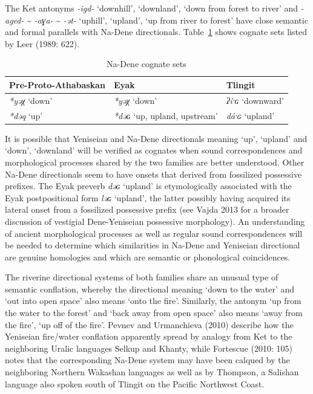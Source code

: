 The Ket antonyms \textit{{}-igd-} ‘downhill’, ‘downland’, ‘down from forest to river’ and \textit{{}-aged-} \~{} \textit{{}-aɣa-} \~{} \textit{{}-ət-} ‘uphill’, ‘upland’, ‘up from river to forest’ have close semantic and formal parallels with Na-Dene directionals. Table~\ref{tab:na-dene} shows cognate sets listed by Leer (1989: 622).

\begin{table}[htb]
\centering
\begin{tabular}{l | l | l}
Pre-Proto-Athabaskan & Eyak & Tlingit \\
\hline
\textit{*yəχ} `down' &  \textit{*yəχ} `down' & \textit{ʔíˑɢ} `downward' \\
\textit{*dəq} `up' & \textit{*dəɢ} `up, upland, upstream' & \textit{d\'{a}ˑɢ} `upland' \\
\end{tabular}
\caption{Na-Dene cognate sets}
\label{tab:na-dene}
\end{table}

It is possible that Yeniseian and Na-Dene directionals meaning ‘up’, ‘upland’ and ‘down’, ‘downland’ will be verified as cognates when sound correspondences and morphological processes shared by the two families are better understood. Other Na-Dene directionals seem to have onsets that derived from fossilized possessive prefixes. The Eyak preverb \textit{dəɢ }‘upland’ is etymologically associated with the Eyak postpositional form\textit{ ləɢ }‘upland’, the latter possibly having acquired its lateral onset from a fossilized possessive prefix (see Vajda 2013 for a broader discussion of vestigial Dene-Yeniseian possessive morphology). An understanding of ancient morphological processes as well as regular sound correspondences will be needed to determine which similarities in Na-Dene and Yeniseian directional are genuine homologies and which are semantic or phonological coincidences.

The riverine directional systems of both families share an unusual type of semantic conflation, whereby the directional meaning ‘down to the water’ and ‘out into open space’ also means ‘onto the fire’. Similarly, the antonym ‘up from the water to the forest’ and ‘back away from open space’ also means ‘away from the fire’, ‘up off of the fire’. Pevnev and Urmanchieva (2010) describe how the Yeniseian fire/water conflation apparently spread by analogy from Ket to the neighboring Uralic languages Selkup and Khanty, while Fortescue (2010: 105) notes that the corresponding Na-Dene system may have been calqued by the neighboring Northern Wakashan languages as well as by Thompson, a Salishan language also spoken south of Tlingit on the Pacific Northwest Coast.

